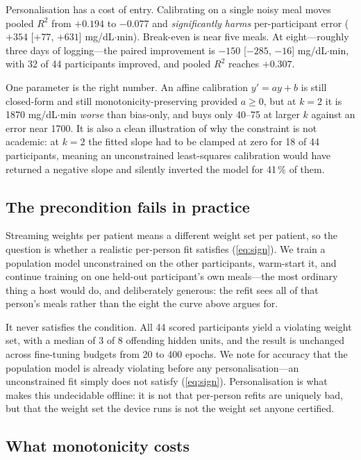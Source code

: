 \documentclass[conference]{IEEEtran}
\begin{document}
Personalisation has a cost of entry. Calibrating on a single noisy meal moves
pooled $R^2$ from $+0.194$ to $-0.077$ and \emph{significantly harms}
per-participant error ($+354$ [$+77$, $+631$] mg/dL$\cdot$min). Break-even is
near five meals. At eight---roughly three days of logging---the paired
improvement is $-150$ [$-285$, $-16$] mg/dL$\cdot$min, with 32 of 44
participants improved, and pooled $R^2$ reaches $+0.307$.

One parameter is the right number. An affine calibration $y' = ay + b$ is still
closed-form and still monotonicity-preserving provided $a \geq 0$, but at $k=2$
it is 1870 mg/dL$\cdot$min \emph{worse} than bias-only, and buys only 40--75 at
larger $k$ against an error near 1700. It is also a clean illustration of why
the constraint is not academic: at $k=2$ the fitted slope had to be clamped at
zero for 18 of 44 participants, meaning an unconstrained least-squares
calibration would have returned a negative slope and silently inverted the
model for 41\,\% of them.

\subsection{The precondition fails in practice}

Streaming weights per patient means a different weight set per patient, so the
question is whether a realistic per-person fit satisfies (\ref{eq:sign}). We
train a population model unconstrained on the other participants, warm-start
it, and continue training on one held-out participant's own meals---the most
ordinary thing a host would do, and deliberately generous: the refit sees all
of that person's meals rather than the eight the curve above argues for.

It never satisfies the condition. All 44 scored participants yield a violating
weight set, with a median of 3 of 8 offending hidden units, and the result is
unchanged across fine-tuning budgets from 20 to 400 epochs. We note for
accuracy that the population model is already violating before any
personalisation---an unconstrained fit simply does not satisfy
(\ref{eq:sign}). Personalisation is what makes this undecidable offline: it is
not that per-person refits are uniquely bad, but that the weight set the device
runs is not the weight set anyone certified.

\subsection{What monotonicity costs}
\end{document}
